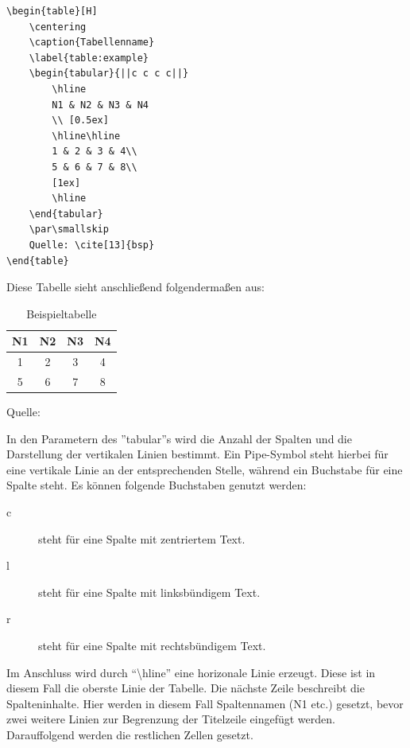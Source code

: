 \begin{lstlisting}
\begin{table}[H]
	\centering
	\caption{Tabellenname}
	\label{table:example}
	\begin{tabular}{||c c c c||}
		\hline
		N1 & N2 & N3 & N4
		\\ [0.5ex]
		\hline\hline
		1 & 2 & 3 & 4\\
		5 & 6 & 7 & 8\\
		[1ex]
		\hline
	\end{tabular}
	\par\smallskip 
	Quelle: \cite[13]{bsp}
\end{table}
\end{lstlisting}

Diese Tabelle sieht anschließend folgendermaßen aus:
\begin{table}[H]
	\centering
	\caption{Beispieltabelle}
	\label{table:example}
	\begin{tabular}{||c c c c||}
		\hline
		N1 & N2 & N3 & N4
		\\ [0.5ex]
		\hline\hline
		1 & 2 & 3 & 4\\
		5 & 6 & 7 & 8\\
		[1ex]
		\hline
	\end{tabular}
	\par\smallskip 
	Quelle: \cite[13]{bsp}
\end{table}

In den Parametern des ''tabular''s wird die Anzahl der Spalten und die Darstellung der vertikalen Linien bestimmt. 
Ein Pipe-Symbol steht hierbei für eine vertikale Linie an der entsprechenden Stelle, während ein Buchstabe für eine Spalte steht. Es können folgende Buchstaben genutzt werden:
\begin{description}
	\item[c] steht für eine Spalte mit zentriertem Text.
	\item[l] steht für eine Spalte mit linksbündigem Text.
	\item[r] steht für eine Spalte mit rechtsbündigem Text.
\end{description}

Im Anschluss wird durch \enquote{\textbackslash hline} eine horizonale Linie erzeugt. 
Diese ist in diesem Fall die oberste Linie der Tabelle. 
Die nächste Zeile beschreibt die Spalteninhalte. 
Hier werden in diesem Fall Spaltennamen (N1 etc.) gesetzt, bevor zwei weitere Linien zur Begrenzung der Titelzeile eingefügt werden. 
Darauffolgend werden die restlichen Zellen gesetzt.